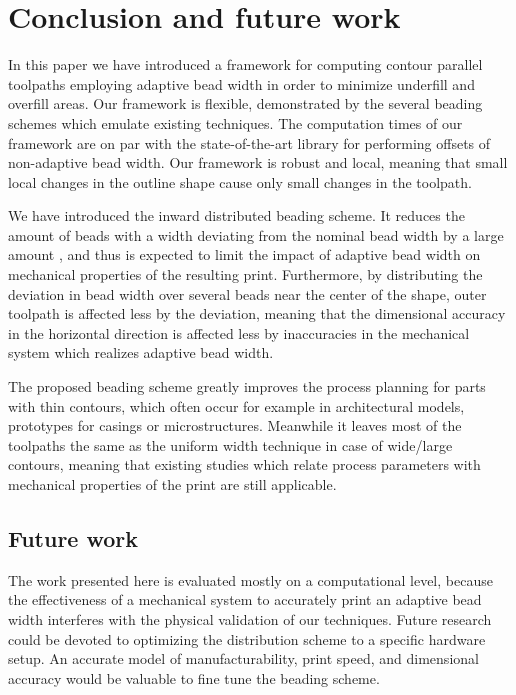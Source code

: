 \section{Conclusion and future work}
In this paper we have introduced a framework for computing contour parallel toolpaths employing adaptive bead width in order to minimize underfill and overfill areas.
Our framework is flexible, demonstrated by the several beading schemes which emulate existing techniques.
The computation times of our framework are on par with the state-of-the-art library for performing offsets of non-adaptive bead width.
Our framework is robust and local, meaning that small local changes in the outline shape cause only small changes in the toolpath.

We have introduced the inward distributed beading scheme.
It reduces the amount of beads with a width deviating from the nominal bead width by a large amount , and thus is expected to limit the impact of adaptive bead width on mechanical properties of the resulting print.
Furthermore, by distributing the deviation in bead width over several beads near the center of the shape, outer toolpath is affected less by the deviation, meaning that the dimensional accuracy in the horizontal direction is affected less by inaccuracies in the mechanical system which realizes adaptive bead width.

The proposed beading scheme greatly improves the process planning for parts with thin contours, which often occur for example in architectural models, prototypes for casings or microstructures.
Meanwhile it leaves most of the toolpaths the same as the uniform width technique in case of wide/large contours, meaning that existing studies which relate process parameters with mechanical properties of the print are still applicable.


\subsection{Future work}
The work presented here is evaluated mostly on a computational level, because the effectiveness of a mechanical system to accurately print an adaptive bead width interferes with the physical validation of our techniques.
Future research could be devoted to optimizing the distribution scheme to a specific hardware setup.
An accurate model of manufacturability, print speed, and dimensional accuracy would be valuable to fine tune the beading scheme.


